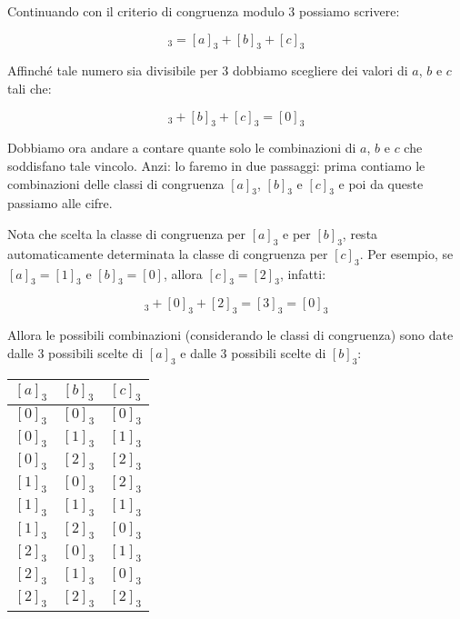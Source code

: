 \begin{soluzione}
    Continuando con il criterio di congruenza modulo 3 possiamo scrivere:

    \begin{equation*}
        [a + b + c]_3 = [a]_3 + [b]_3 + [c]_3
    \end{equation*}

    Affinché tale numero sia divisibile per 3 dobbiamo scegliere dei valori di $a$, $b$ e $c$ tali che:

    \begin{equation*}
        [a]_3 + [b]_3 + [c]_3 = [0]_3
    \end{equation*}

    Dobbiamo ora andare a contare quante solo le combinazioni di $a$, $b$ e $c$ che soddisfano tale vincolo.
    Anzi: lo
    faremo in due passaggi: prima contiamo le combinazioni delle classi di congruenza $[a]_3$, $[b]_3$ e $[c]_3$ e poi
    da queste passiamo alle cifre.

    Nota che scelta la classe di congruenza per $[a]_3$ e per $[b]_3$, resta automaticamente determinata la classe di
    congruenza per $[c]_3$.
    Per esempio, se $[a]_3 = [1]_3$ e $[b]_3 = [0]$, allora $[c]_3 =  [2]_3$, infatti:

    \begin{equation*}
        [1]_3 + [0]_3 + [2]_3 = [3]_3 = [0]_3
    \end{equation*}

    Allora le possibili combinazioni (considerando le classi di congruenza) sono date dalle 3 possibili scelte di $[a]_3$
    e dalle 3 possibili scelte di $[b]_3$:

    \begin{table}[H]
        \label{tab:distrettuali_2019_1}
        \centering
        \begin{tabular}{ccc}
            \toprule
            $[a]_3$ & $[b]_3$ & $[c]_3$ \\
            \midrule
            $[0]_3$ & $[0]_3$ & $[0]_3$ \\
            $[0]_3$ & $[1]_3$ & $[1]_3$ \\
            $[0]_3$ & $[2]_3$ & $[2]_3$ \\
            $[1]_3$ & $[0]_3$ & $[2]_3$ \\
            $[1]_3$ & $[1]_3$ & $[1]_3$ \\
            $[1]_3$ & $[2]_3$ & $[0]_3$ \\
            $[2]_3$ & $[0]_3$ & $[1]_3$ \\
            $[2]_3$ & $[1]_3$ & $[0]_3$ \\
            $[2]_3$ & $[2]_3$ & $[2]_3$ \\
            \bottomrule
        \end{tabular}
    \end{table}


\end{soluzione}
